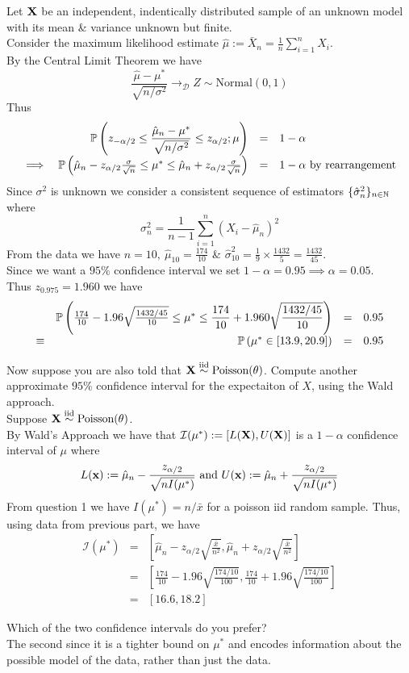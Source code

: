 \documentclass[11pt,a4paper]{article}
\begin{document}
\apart
Let $\textbf{X}$ be an independent, indentically distributed sample of an unknown model with its mean \& variance unknown but finite.\\
Consider the maximum likelihood estimate $\hat\mu:=\bar{X}_n=\frac{1}{n}\sum_{i=1}^nX_i$.\\
By the Central Limit Theorem we have
$$\frac{\hat\mu-\mu^*}{\sqrt{n/\sigma^2}}\to_{\mathcal{D}}Z\sim\text{Normal}(0,1)$$
Thus
\[\begin{array}{rrcl}
&\mathbb{P}\left(z_{-\alpha/2}\leq\dfrac{\hat\mu_n-\mu^*}{\sqrt{n/\sigma^2}}\leq z_{\alpha/2};\mu\right)&=&1-\alpha\\
\implies&\mathbb{P}\left(\hat\mu_n-z_{\alpha/2}\frac{\sigma}{\sqrt{n}}\leq\mu^*\leq\hat\mu_n+z_{\alpha/2}\frac{\sigma}{\sqrt{n}}\right)&=&1-\alpha\text{ by rearrangement}
\end{array}\]
Since $\sigma^2$ is unknown we consider a consistent sequence of estimators $\{\hat\sigma^2_n\}_{n\in\mathbb{N}}$ where
$$\sigma^2_n=\frac{1}{n-1}\sum\limits_{i=1}^n(X_i-\hat\mu_n)^2$$
From the data we have $n=10,\ \hat\mu_{10}=\frac{174}{10}$ \& $\hat\sigma^2_{10}=\frac{1}{9}\times\frac{1432}{5}=\frac{1432}{45}$.\\
Since we want a $95\%$ confidence interval we set $1-\alpha=0.95\implies\alpha=0.05$.\\
Thus $z_{0.975}=1.960$ we have
\[\begin{array}{rrcl}
&\mathbb{P}\left(\frac{174}{10}-1.96\sqrt{\frac{1432/45}{10}}\leq\mu^*\leq\dfrac{174}{10}+1.960\sqrt{\dfrac{1432/45}{10}}\right)&=&0.95\\
\equiv&\mathbb{P}\left(\mu^*\in[13.9,20.9]\right)&=&0.95
\end{array}\]

\qpart
Now suppose you are also told that $\textbf{X}\overset{\text{iid}}{\sim}\text{Poisson}(\theta)$. Compute another approximate $95\%$ confidence interval for the expectaiton of $X$, using the Wald approach.\\

\apart
Suppose $\textbf{X}\overset{\text{iid}}{\sim}\text{Poisson}(\theta)$.\\
By Wald's Approach we have that $\mathcal{I}(\mu^*):=[L(\textbf{X}),U(\textbf{X})]$ is a $1-\alpha$ confidence interval of $\mu$ where
$$L(\textbf{x}):=\hat\mu_n-\frac{z_{\alpha/2}}{\sqrt{nI(\mu^*)}}\text{ and }U(\textbf{x}):=\hat\mu_n+\dfrac{z_{\alpha/2}}{\sqrt{nI(\mu^*)}}$$
From question 1 we have $I(\mu^*)=n/\bar{x}$ for a poisson iid random sample. Thus, using data from previous part, we have
\[\begin{array}{rcl}
\mathcal{I}(\mu^*)&=&\left[\hat\mu_n-z_{\alpha/2}\sqrt{\frac{\bar{x}}{n^2}},\hat\mu_n+z_{\alpha/2}\sqrt{\frac{\bar{x}}{n^2}}\right]\\
&=&\left[\frac{174}{10}-1.96\sqrt{\frac{174/10}{100}},\frac{174}{10}+1.96\sqrt{\frac{174/10}{100}}\right]\\
&=&[16.6,18.2]
\end{array}\]

\qpartt Which of the two confidence intervals do you prefer?\\

\apartt
The second since it is a tighter bound on $\mu^*$ and encodes information about the possible model of the data, rather than just the data.
\end{document}
